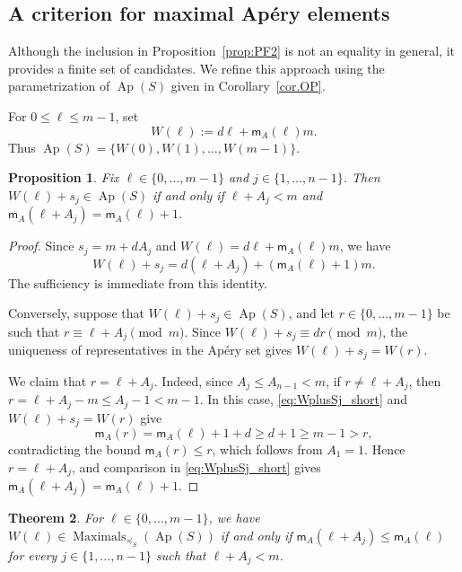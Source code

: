 \documentclass[12pt,a4paper]{amsart}
\newtheorem{theorem}{Theorem}[section]
\newtheorem{proposition}[theorem]{Proposition}
\theoremstyle{definition}
\begin{document}
\subsection{A criterion for maximal Apéry elements}

Although the inclusion in Proposition~\ref{prop:PF2} is not an equality in general, it provides a finite set of candidates. We refine this approach using the parametrization of $\operatorname{Ap}(S)$ given in Corollary~\ref{cor.OP}.

For $0\le \ell\le m-1$, set
\[
W(\ell):=d\ell+\mathsf{m}_A(\ell)m.
\]
Thus $\operatorname{Ap}(S)=\{W(0),W(1),\ldots,W(m-1)\}$.

\begin{proposition}\label{prop:WplusSj_inApery}
Fix $\ell\in\{0,\ldots,m-1\}$ and $j\in\{1,\ldots,n-1\}$. Then $W(\ell)+s_j\in\operatorname{Ap}(S)$ if and only if $\ell+A_j<m$ and $\mathsf{m}_A(\ell+A_j)=\mathsf{m}_A(\ell)+1$.
\end{proposition}

\begin{proof}
Since $s_j=m+dA_j$ and $W(\ell)=d\ell+\mathsf{m}_A(\ell)m$, we have 
\begin{equation}\label{eq:WplusSj_short}
W(\ell)+s_j=d(\ell+A_j)+\left(\mathsf{m}_A(\ell)+1\right)m.
\end{equation}
The sufficiency is immediate from this identity.

Conversely, suppose that $W(\ell)+s_j\in\operatorname{Ap}(S)$, and let $r\in\{0,\ldots,m-1\}$ be such that $r\equiv \ell+A_j\pmod m$. Since $W(\ell)+s_j\equiv dr\pmod m$, the uniqueness of representatives in the Ap\'ery set gives $W(\ell)+s_j=W(r)$.

We claim that $r=\ell+A_j$. Indeed, since $A_j\le A_{n-1}<m$, if $r\ne\ell+A_j$, then $r=\ell+A_j-m\le A_j-1<m-1$. In this case, \eqref{eq:WplusSj_short} and $W(\ell)+s_j=W(r)$ give
\[
\mathsf{m}_A(r)=\mathsf{m}_A(\ell)+1+d\ge d+1\ge m-1>r,
\]
contradicting the bound $\mathsf m_A(r)\le r$, which follows from $A_1=1$. Hence $r=\ell+A_j$, and comparison in \eqref{eq:WplusSj_short} gives $\mathsf{m}_A(\ell+A_j)=\mathsf{m}_A(\ell)+1$.
\end{proof}

\begin{theorem}\label{th:maxcrit_mA}
For $\ell\in\{0,\ldots,m-1\}$, we have $W(\ell) \in \operatorname{Maximals}_{\preceq_S}(\operatorname{Ap}(S))$ if and only if $\mathsf{m}_A(\ell+A_j)\le \mathsf{m}_A(\ell)$ for every $j\in\{1,\ldots,n-1\}$ such that $\ell+A_j<m$.
\end{theorem}
\end{document}
